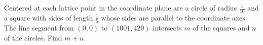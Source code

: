 Centered at each lattice point in the coordinate plane are a circle of radius $\tfrac{1}{10}$ and a square with sides of length $\tfrac{1}{5}$ whose sides are parallel to the coordinate axes. The line segment from $(0, 0)$ to $(1001, 429)$ intersects $m$ of the squares and $n$ of the circles. Find $m + n$.